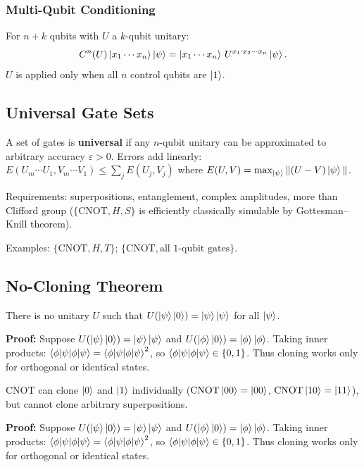 \documentclass[10pt,a4paper]{article}
\begin{document}
\subsubsection*{Multi-Qubit Conditioning}

For $n+k$ qubits with $U$ a $k$-qubit unitary:
\[
C^n(U)\ket{x_1\cdots x_n}\ket{\psi}=\ket{x_1\cdots x_n}\,U^{x_1\cdot x_2\cdots x_n}\ket{\psi}.
\]
$U$ is applied only when all $n$ control qubits are $\ket{1}$.

\subsection{Universal Gate Sets}



\begin{tcolorbox}[defstyle, title={Definition: Universal Gate Set}]
A set of gates is \textbf{universal} if any $n$-qubit unitary can be approximated to arbitrary accuracy $\varepsilon>0$. Errors add linearly: $E(U_m\cdots U_1,V_m\cdots V_1)\le\sum_j E(U_j,V_j)$ where $E(U,V)=\max_{\ket{\psi}}\|(U-V)\ket{\psi}\|$.
\end{tcolorbox}

Requirements: superpositions, entanglement, complex amplitudes, more than Clifford group ($\{\mathrm{CNOT},H,S\}$ is efficiently classically simulable by Gottesman--Knill theorem).

Examples: $\{\mathrm{CNOT},H,T\}$; $\{\mathrm{CNOT},\text{all 1-qubit gates}\}$.

\subsection{No-Cloning Theorem}

\begin{tcolorbox}[propstyle, title={Theorem: No-Cloning}]
There is no unitary $U$ such that $U(\ket{\psi}\ket{0})=\ket{\psi}\ket{\psi}$ for all $\ket{\psi}$.
\end{tcolorbox}
\textbf{Proof:} Suppose $U(\ket{\psi}\ket{0})=\ket{\psi}\ket{\psi}$ and $U(\ket{\phi}\ket{0})=\ket{\phi}\ket{\phi}$. Taking inner products: $\braket{\phi|\psi}=\braket{\phi|\psi}^2$, so $\braket{\phi|\psi}\in\{0,1\}$. Thus cloning works only for orthogonal or identical states.

CNOT can clone $\ket{0}$ and $\ket{1}$ individually ($\mathrm{CNOT}\ket{00}=\ket{00}$, $\mathrm{CNOT}\ket{10}=\ket{11}$), but cannot clone arbitrary superpositions.

\textbf{Proof:} Suppose $U(\ket{\psi}\ket{0})=\ket{\psi}\ket{\psi}$ and $U(\ket{\phi}\ket{0})=\ket{\phi}\ket{\phi}$. Taking inner products: $\braket{\phi|\psi}=\braket{\phi|\psi}^2$, so $\braket{\phi|\psi}\in\{0,1\}$. Thus cloning works only for orthogonal or identical states.
\end{document}
